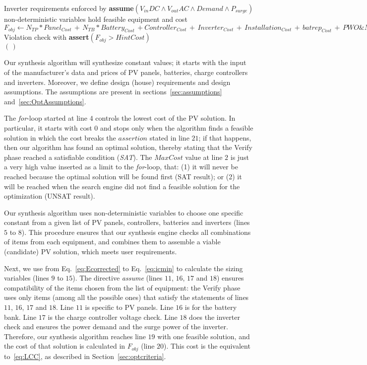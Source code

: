 \begin{algorithm}
\begin{algorithmic}[1]
	\STATE Inverter requirements enforced by \textbf{assume}$(V_{in}DC \wedge V_{out}AC \wedge Demand \wedge P_{surge})$ \\
	\STATE non-deterministic variables hold feasible equipment and cost  \\
	\STATE $F_{obj} \leftarrow  N_{TP}*Panel_{Cost} \, + \, N_{TB}*Battery_{Cost} \, + Controller_{Cost} \, + \, Inverter_{Cost} \, + \, Installation_{Cost} \, + \, batrep_{Cost} \, + \, PWO\&M_{Cost}$ \\
	\STATE Violation check with \textbf{assert}$(F_{obj} > HintCost)$ \\
  \ENDFOR
 \RETURN $(\,)$ 
 \end{algorithmic} 
 \label{alg:opt-algorithm}
 \end{algorithm}

Our synthesis algorithm will synthesize constant values; 
it starts with the input of the manufacturer's data and prices of PV panels, batteries, charge controllers and inverters. Moreover, we define design (house) requirements and design assumptions. The assumptions are present in sections~\ref{sec:assumptions} and~\ref{sec:OptAssumptions}.

The \textit{for}-loop started at line $4$ controls the lowest cost of the PV solution. In particular, it starts with cost $0$ and stops only when the algorithm finds a feasible solution in which the cost breaks the $assertion$ stated in line $21$; if that happens, then our algorithm has found an optimal solution, thereby stating that the {\sc Verify} phase reached a satisfiable condition (\textit{SAT}). The $MaxCost$ value at line $2$ is just a very high value inserted as a limit to the \textit{for}-loop, that: (1) it will never be reached because the optimal solution will be found first (SAT result); or (2) it will be reached when the search engine did not find a feasible solution for the optimization (UNSAT result).

Our synthesis algorithm uses non-deterministic variables to choose one specific constant from a given list of PV panels, controllers, batteries and inverters (lines $5$ to $8$). This procedure ensures that our synthesis engine checks all combinations of items from each equipment, and combines them to assemble a viable (candidate) PV solution, which meets user requirements.

Next, we use from Eq.~\eqref{eq:Ecorrected} to Eq.~\eqref{eq:icmin} to calculate the sizing variables (lines $9$ to $15$). The directive \textit{assume} (lines $11$, $16$, $17$ and $18$) ensures compatibility of the items chosen from the list of equipment: the {\sc Verify} phase uses only items (among all the possible ones) that satisfy the statements of lines $11$, $16$, $17$ and $18$. Line $11$ is specific to PV panels. Line $16$ is for the battery bank. Line $17$ is the charge controller voltage check. Line $18$ does the inverter check and ensures the power demand and the surge power of the inverter.
Therefore, our synthesis algorithm reaches line $19$ with one feasible solution, and the cost of that solution is calculated in $F_{obj}$ (line $20$). This cost is the equivalent to~\ref{eq:LCC}, as described in Section~\ref{sec:optcriteria}.

